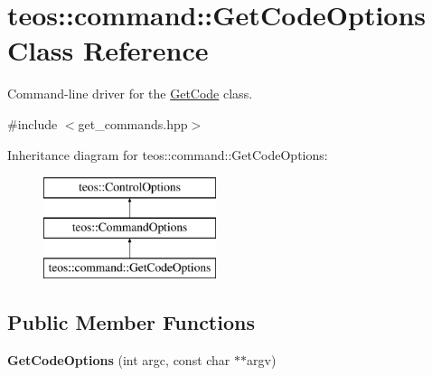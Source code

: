 \hypertarget{classteos_1_1command_1_1_get_code_options}{}\section{teos\+:\+:command\+:\+:Get\+Code\+Options Class Reference}
\label{classteos_1_1command_1_1_get_code_options}


Command-\/line driver for the \mbox{\hyperlink{classteos_1_1command_1_1_get_code}{Get\+Code}} class.  




{\ttfamily \#include $<$get\+\_\+commands.\+hpp$>$}

Inheritance diagram for teos\+:\+:command\+:\+:Get\+Code\+Options\+:\begin{figure}[H]
\begin{center}
\leavevmode
\includegraphics[height=3.000000cm]{classteos_1_1command_1_1_get_code_options}
\end{center}
\end{figure}
\subsection*{Public Member Functions}
\begin{DoxyCompactItemize}
\item 
\mbox{\label{classteos_1_1command_1_1_get_code_options_ae378530fd0d71e3317d249166bffb2b9}} 
{\bfseries Get\+Code\+Options} (int argc, const char $\ast$$\ast$argv)
\end{DoxyCompactItemize}

